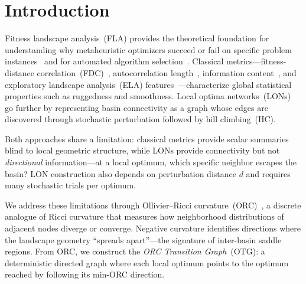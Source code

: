 \documentclass[runningheads]{llncs}
\begin{document}


\section{Introduction}
\label{sec:intro}

Fitness landscape analysis~(FLA) provides the theoretical foundation for understanding why metaheuristic optimizers succeed or fail on specific problem instances~\cite{pitzer2012comprehensive} and for automated algorithm selection~\cite{kerschke2019automated}.
Classical metrics---fitness-distance correlation~(FDC)~\cite{jones1995fitness}, autocorrelation length~\cite{stadler1996landscapes}, information content~\cite{vassilev2000information}, and exploratory landscape analysis~(ELA) features~\cite{mersmann2011exploratory}---characterize global statistical properties such as ruggedness and smoothness.
Local optima networks~(LONs)~\cite{ochoa2008first,ochoa2017understanding} go further by representing basin connectivity as a graph whose edges are discovered through stochastic perturbation followed by hill climbing~(HC).

Both approaches share a limitation: classical metrics provide scalar summaries blind to local geometric structure, while LONs provide connectivity but not \emph{directional} information---at a local optimum, which specific neighbor escapes the basin?
LON construction also depends on perturbation distance $d$ and requires many stochastic trials per optimum.

We address these limitations through Ollivier--Ricci curvature~(ORC)~\cite{ollivier2009ricci}, a discrete analogue of Ricci curvature that measures how neighborhood distributions of adjacent nodes diverge or converge.
Negative curvature identifies directions where the landscape geometry ``spreads apart''---the signature of inter-basin saddle regions.
From ORC, we construct the \emph{ORC Transition Graph}~(OTG): a deterministic directed graph where each local optimum points to the optimum reached by following its min-ORC direction.
\end{document}
